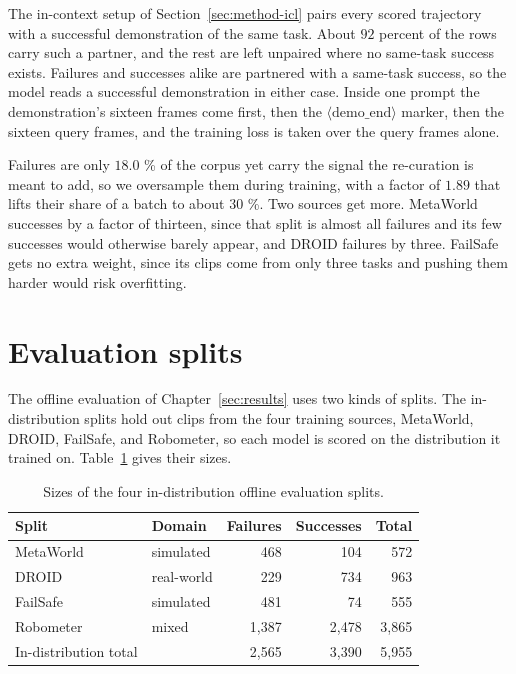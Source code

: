 The in-context setup of Section~\ref{sec:method-icl} pairs every scored trajectory with a successful demonstration of the same task. About $92$ percent of the rows carry such a partner, and the rest are left unpaired where no same-task success exists. Failures and successes alike are partnered with a same-task success, so the model reads a successful demonstration in either case. Inside one prompt the demonstration's sixteen frames come first, then the $\langle\mathrm{demo\_end}\rangle$ marker, then the sixteen query frames, and the training loss is taken over the query frames alone.

Failures are only $18.0$ \% of the corpus yet carry the signal the re-curation is meant to add, so we oversample them during training, with a factor of $1.89$ that lifts their share of a batch to about $30$ \%. Two sources get more. MetaWorld successes by a factor of thirteen, since that split is almost all failures and its few successes would otherwise barely appear, and DROID failures by three. FailSafe gets no extra weight, since its clips come from only three tasks and pushing them harder would risk overfitting.

\section{Evaluation splits}
\label{apx:eval-splits}

The offline evaluation of Chapter~\ref{sec:results} uses two kinds of splits. The in-distribution splits hold out clips from the four training sources, MetaWorld, DROID, FailSafe, and Robometer, so each model is scored on the distribution it trained on. Table~\ref{tab:eval-splits} gives their sizes.

\begin{table}[h]
\centering\footnotesize
\caption[Offline evaluation splits]{Sizes of the four in-distribution offline evaluation splits.}
\label{tab:eval-splits}
\begin{tabular}{@{}p{3.0cm}p{2.4cm}rrr@{}}
\toprule
Split & Domain & Failures & Successes & Total \\
\midrule
MetaWorld & simulated & 468 & 104 & 572 \\
DROID & real-world & 229 & 734 & 963 \\
FailSafe & simulated & 481 & 74 & 555 \\
Robometer & mixed & 1{,}387 & 2{,}478 & 3{,}865 \\
\midrule
In-distribution total & & 2{,}565 & 3{,}390 & 5{,}955 \\
\bottomrule
\end{tabular}
\end{table}

